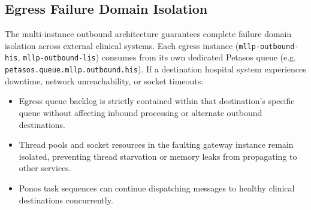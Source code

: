 \subsection{Egress Failure Domain Isolation}
The multi-instance outbound architecture guarantees complete failure domain isolation across external clinical systems. Each egress instance (\texttt{mllp-outbound-his}, \texttt{mllp-outbound-lis}) consumes from its own dedicated Petasos queue (e.g. \texttt{petasos.queue.mllp.outbound.his}). If a destination hospital system experiences downtime, network unreachability, or socket timeouts:
\begin{itemize}
    \item Egress queue backlog is strictly contained within that destination's specific queue without affecting inbound processing or alternate outbound destinations.
    \item Thread pools and socket resources in the faulting gateway instance remain isolated, preventing thread starvation or memory leaks from propagating to other services.
    \item Ponos task sequences can continue dispatching messages to healthy clinical destinations concurrently.
\end{itemize}

\newpage
